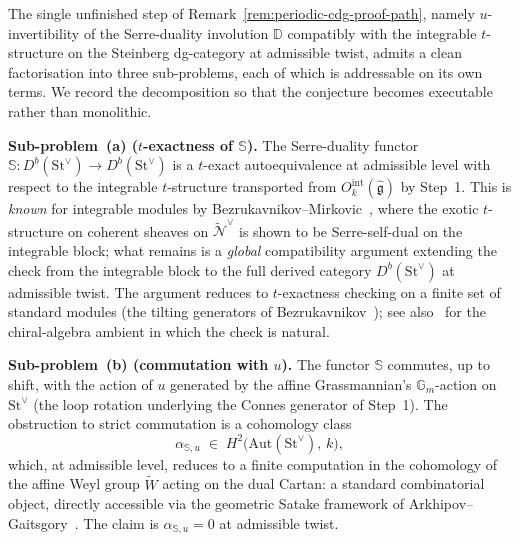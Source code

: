 \begin{remark}
\label{rem:serre-duality-u-invertibility-decomposition}
%
%
The single unfinished step of
Remark~\textup{\ref{rem:periodic-cdg-proof-path}}, namely $u$-invertibility
of the Serre-duality involution $\mathbb{D}$ compatibly with the
integrable $t$-structure on the Steinberg dg-category at admissible
twist, admits a clean factorisation into three sub-problems, each
of which is addressable on its own terms. We record the
decomposition so that the conjecture becomes executable rather than
monolithic.

\medskip
\noindent\textbf{Sub-problem~(a) ($t$-exactness of $\mathbb{S}$).}
The Serre-duality functor
$\mathbb{S} \colon D^b(\mathrm{St}^\vee) \to D^b(\mathrm{St}^\vee)$
is a $t$-exact autoequivalence at admissible level with respect to
the integrable $t$-structure transported from
$O^{\mathrm{int}}_k(\widehat{\mathfrak{g}})$ by Step~1. This is
\emph{known} for integrable modules by
Bezrukavnikov--Mirkovic~\cite{Bezrukavnikov16}, where the
exotic $t$-structure on coherent sheaves on
$\widetilde{\mathcal{N}}^\vee$ is shown to be Serre-self-dual on the
integrable block; what remains is a \emph{global} compatibility
argument extending the check from the integrable block to the full
derived category $D^b(\mathrm{St}^\vee)$ at admissible twist. The
argument reduces to $t$-exactness checking on a finite set of
standard modules (the tilting generators of
Bezrukavnikov~\cite{Bezrukavnikov16}); see also~\cite{BD04} for the
chiral-algebra ambient in which the check is natural.

\medskip
\noindent\textbf{Sub-problem~(b) (commutation with $u$).}
The functor $\mathbb{S}$ commutes, up to shift, with the action of
$u$ generated by the affine Grassmannian's $\mathbb{G}_m$-action on
$\mathrm{St}^\vee$ (the loop rotation underlying the Connes
generator of Step~1). The obstruction to strict commutation is a
cohomology class
\[
\alpha_{\mathbb{S},u} \;\in\;
H^2\!\bigl(\mathrm{Aut}(\mathrm{St}^\vee),\,k\bigr),
\]
which, at admissible level, reduces to a finite computation in the
cohomology of the affine Weyl group $\widetilde{W}$ acting on the
dual Cartan: a standard combinatorial object, directly accessible
via the geometric Satake framework of
Arkhipov--Gaitsgory~\cite{ArkhipovGaitsgory09}. The claim is
$\alpha_{\mathbb{S},u} = 0$ at admissible twist.


\end{remark}
